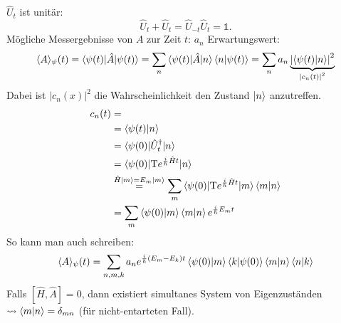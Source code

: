 		$\hat{U}_t$ ist unitär: 		
			\begin{equation}
				\hat{U}_t + \hat{U}_t = \hat{U}_{-t} \hat{U}_t = \mathds{1}.
			\end{equation}
		Mögliche Messergebnisse von $A$ zur Zeit $t$: $a_n$
		Erwartungswert:	
			\begin{align*}
				\langle {A} \rangle_\psi (t) = \braket{\psi(t) | \hat{A} | \psi(t)} = \sum_n \braket{\psi(t) | \hat{A} | n} \braket{n | \psi(t)} = \sum_n a_n 
				\underbrace{\left| \braket{\psi(t) | n} \right|^2}_{\substack{|c_n(t)|^2}}				
			\end{align*}
		Dabei ist $|c_n(x)|^2$ die Wahrscheinlichkeit den Zustand $\ket{n}$ anzutreffen.
			\begin{align*}
				c_n(t) &= \\
				&= \braket{\psi(t) | n} \\
				&= \braket{\psi(0) | \hat{U}_t^\dagger | n} \\
				&= \braket{\psi(0) | \text{T} e^{\frac{i}{\hbar} \hat{H} t} | n} \\
				& \overset{\hat{H}\ket{m} = E_m \ket{m}}{=} 
				\sum_m \braket{\psi(0) | \text{T} e^{ \frac{i}{\hbar} \hat{H} t} | m} \braket{m | n} \\
				&= \sum_m \braket{\psi(0) | m} \braket{m | n} e^{ \frac{i}{\hbar} E_m t}
			\end{align*}
		So kann man auch schreiben:
			\begin{equation*}
				\langle {A} \rangle_\psi (t) =
				\sum_{n,m,k} a_n e^{ \frac{i}{\hbar} (E_m - E_k) t} 
				\braket{\psi(0) | m} \braket{k | \psi(0)} \braket{m | n} \braket{n | k}
			\end{equation*}
		Falls $[\hat{H} , \hat{A}] = 0$, dann existiert simultanes System von Eigenzuständen $\leadsto \braket{m | n} = \delta_{mn}$ (für nicht-entarteten Fall).
